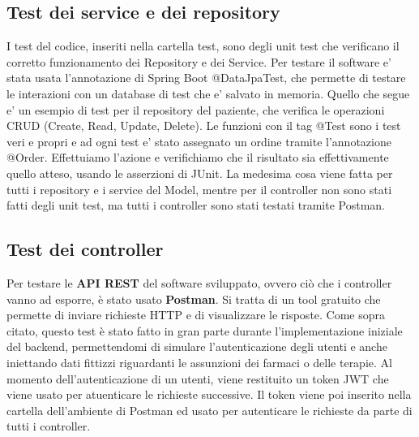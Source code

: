 \documentclass{article}
\begin{document}
\subsection{Test dei service e dei repository}
I test del codice, inseriti nella cartella test, sono degli unit test che verificano il corretto 
funzionamento dei Repository e dei Service. Per testare il software e' stata usata l'annotazione di 
Spring Boot @DataJpaTest, che permette di testare le interazioni con un database di test che e' salvato in memoria.
Quello che segue e' un esempio di test per il repository del paziente, che verifica le operazioni 
CRUD (Create, Read, Update, Delete). Le funzioni con il tag @Test sono i test veri e propri e ad ogni test
e' stato assegnato un ordine tramite l'annotazione @Order. Effettuiamo l'azione e verifichiamo che il risultato
sia effettivamente quello atteso, usando le asserzioni di JUnit.
La medesima cosa viene fatta per tutti i repository e i service del Model, mentre per il controller
non sono stati fatti degli unit test, ma tutti i controller sono stati testati tramite Postman.

\subsection{Test dei controller}
Per testare le \textbf{API REST} del software sviluppato, ovvero ciò che i controller vanno ad esporre, è stato usato \textbf{Postman}.
Si tratta di un tool gratuito che permette di inviare richieste HTTP e di visualizzare le risposte. Come sopra citato, questo test è stato fatto in gran parte
durante l'implementazione iniziale del backend, permettendomi di simulare l'autenticazione degli utenti e anche iniettando dati fittizzi riguardanti le assunzioni dei farmaci
o delle terapie. Al momento dell'autenticazione di un utenti, viene restituito un token JWT che viene usato per atuenticare le richieste successive. Il token viene poi inserito nella cartella
dell'ambiente di Postman ed usato per autenticare le richieste da parte di tutti i controller.
\end{document}

